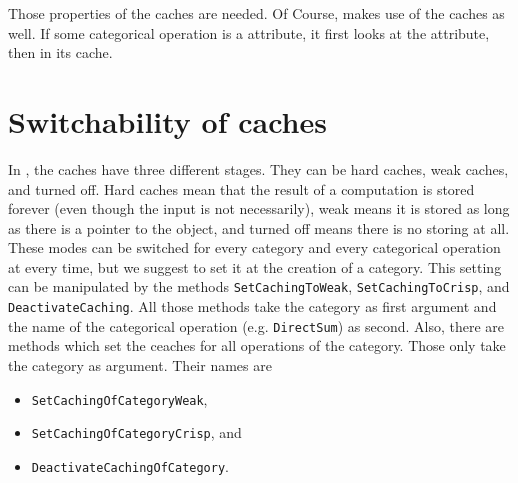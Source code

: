 Those properties of the \CapPkg caches are needed. Of Course, \CapPkg makes use of the \GAP caches as well. If some categorical
operation is a \GAP attribute, it first looks at the \GAP attribute, then in its \CapPkg cache.

\section{Switchability of caches}

In \CapPkg, the caches have three different stages. They can be hard caches, weak caches, and turned off.
Hard caches mean that the result of a computation is stored forever (even though the input is not necessarily), weak means it is stored as long as
there is a pointer to the object, and turned off means there is no storing at all. These modes can be switched for
every category and every categorical operation at every time, but we suggest to set it at the creation of a category.
This setting can be manipulated by the methods \texttt{SetCachingToWeak}, \texttt{SetCachingToCrisp}, and \texttt{DeactivateCaching}.
All those methods take the category as first argument and the name of the categorical operation (e.g. \texttt{DirectSum}) as second.
Also, there are methods which set the ceaches for all operations of the category. Those only take the category as argument.
Their names are
\begin{itemize}
	\item \texttt{SetCachingOfCategoryWeak},
	\item \texttt{SetCachingOfCategoryCrisp}, and
	\item\texttt{DeactivateCachingOfCategory}.
\end{itemize}
